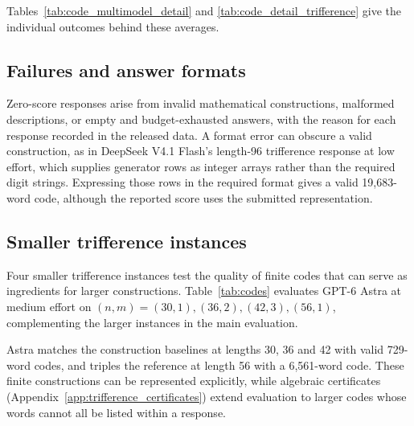 \appendixpage
Tables~\ref{tab:code_multimodel_detail} and \ref{tab:code_detail_trifference} give the individual outcomes behind these averages.
\begin{center}\small\setlength{\tabcolsep}{5pt}

\label{tab:code_multimodel_detail}
\end{center}
\begin{center}\small\setlength{\tabcolsep}{5pt}

\label{tab:code_detail_trifference}
\end{center}
\appendixpage
\subsection{Failures and answer formats}
Zero-score responses arise from invalid mathematical constructions, malformed descriptions, or empty and budget-exhausted answers, with the reason for each response recorded in the released data. A format error can obscure a valid construction, as in DeepSeek V4.1 Flash's length-96 trifference response at low effort, which supplies generator rows as integer arrays rather than the required digit strings. Expressing those rows in the required format gives a valid 19,683-word code, although the reported score uses the submitted representation.

\subsection{Smaller trifference instances}
\label{app:codes}
Four smaller trifference instances test the quality of finite codes that can serve as ingredients for larger constructions. Table~\ref{tab:codes} evaluates GPT-6 Astra at medium effort on $(n,m)=(30,1),(36,2),(42,3),(56,1)$, complementing the larger instances in the main evaluation.

Astra matches the construction baselines at lengths 30, 36 and 42 with valid 729-word codes, and triples the reference at length 56 with a 6,561-word code. These finite constructions can be represented explicitly, while algebraic certificates (Appendix~\ref{app:trifference_certificates}) extend evaluation to larger codes whose words cannot all be listed within a response.

\appendixpage
